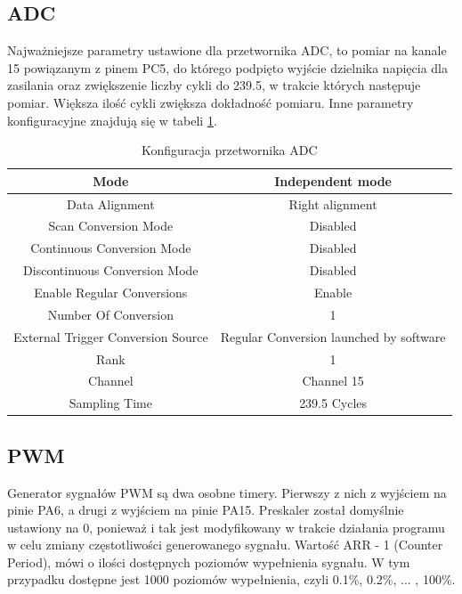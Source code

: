 \subsection{ADC}

Najważniejsze parametry ustawione dla przetwornika ADC, to pomiar na kanale 15 powiązanym z pinem PC5, do którego podpięto wyjście dzielnika napięcia dla zasilania oraz zwiększenie liczby cykli do 239.5, w trakcie których następuje pomiar. Większa ilość cykli zwiększa dokładność pomiaru. Inne parametry konfiguracyjne znajdują się w tabeli \ref{Konfiguracja przetwornika ADC}.

\begin{table}[h!]
    \centering
    \caption{Konfiguracja przetwornika ADC}
    \begin{tabular}{|c|c|}
        \hline
        Mode & Independent mode \\
        \hline
        Data Alignment & Right alignment \\
        \hline
        Scan Conversion Mode & Disabled \\
        \hline
        Continuous Conversion Mode & Disabled \\
        \hline
        Discontinuous Conversion Mode & Disabled \\
        \hline
        Enable Regular Conversions & Enable \\
        \hline
        Number Of Conversion &  1 \\
        \hline
        External Trigger Conversion Source & Regular Conversion launched by software \\
        \hline
        Rank & 1 \\
        \hline
        Channel & Channel 15 \\
        \hline
        Sampling Time & 239.5 Cycles \\
        \hline
    \end{tabular}
    \label{Konfiguracja przetwornika ADC}
\end{table}

\subsection{PWM}

Generator sygnałów PWM są dwa osobne timery. Pierwszy z nich z wyjściem na pinie PA6, a drugi z wyjściem na pinie PA15. Preskaler został domyślnie ustawiony na 0, ponieważ i tak jest modyfikowany w trakcie działania programu w celu zmiany częstotliwości generowanego sygnału. Wartość ARR - 1 (Counter Period), mówi o ilości dostępnych poziomów wypełnienia sygnału. W tym przypadku dostępne jest 1000 poziomów wypełnienia, czyli 0.1\%, 0.2\%, ... , 100\%. 


